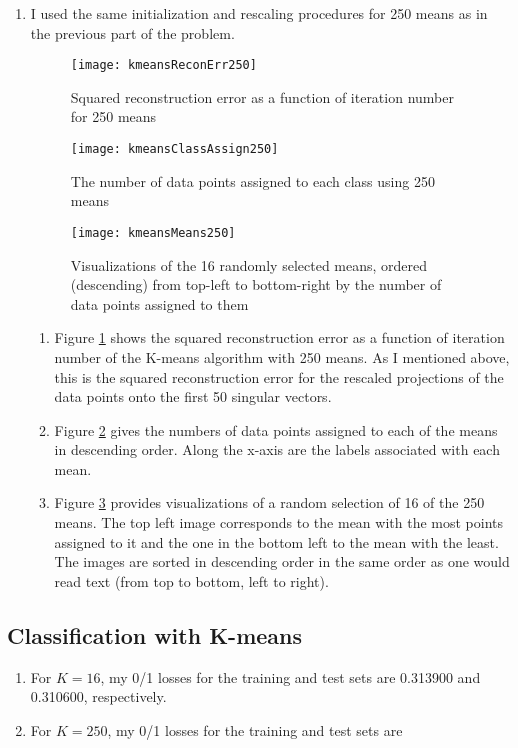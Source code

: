 \documentclass{article}
\begin{document}
\begin{enumerate}
	\item I used the same initialization and rescaling procedures for 250 means as in the previous part of the problem.

	\begin{figure}
		\centering
	    	\texttt{[image: kmeansReconErr250]}
	    	\caption{Squared reconstruction error as a function of iteration number for 250 means}
	    	\label{fig:kmErr250}
	\end{figure}
	\begin{figure}
		\centering
	    	\texttt{[image: kmeansClassAssign250]}
	    	\caption{The number of data points assigned to each class using 250 means}
	    	\label{fig:kmAs250}
	\end{figure}

	\begin{figure}
		\centering
		\texttt{[image: kmeansMeans250]}
		\caption{Visualizations of the 16 randomly selected means, ordered (descending) from top-left to bottom-right by the number of data points assigned to them}
		\label{fig:kmVis250}
	\end{figure}

	\begin{enumerate}
		\item Figure \ref{fig:kmErr250} shows the squared reconstruction error as a function of iteration number of the K-means algorithm with 250 means. As I mentioned above, this is the squared reconstruction error for the rescaled projections of the data points onto the first 50 singular vectors.
		\item Figure \ref{fig:kmAs250} gives the numbers of data points assigned to each of the means in descending order. Along the x-axis are the labels associated with each mean.
		\item Figure \ref{fig:kmVis250} provides visualizations of a random selection of 16 of the 250 means. The top left image corresponds to the mean with the most points assigned to it and the one in the bottom left to the mean with the least. The images are sorted in descending order in the same order as one would read text (from top to bottom, left to right).
	\end{enumerate}
\end{enumerate}

\subsection{Classification with K-means}
\begin{enumerate}
	\item For $K=16$, my 0/1 losses for the training and test sets are 0.313900 and 0.310600, respectively.
	\item For $K=250$, my 0/1 losses for the training and test sets are 
\end{enumerate}
\end{document}
